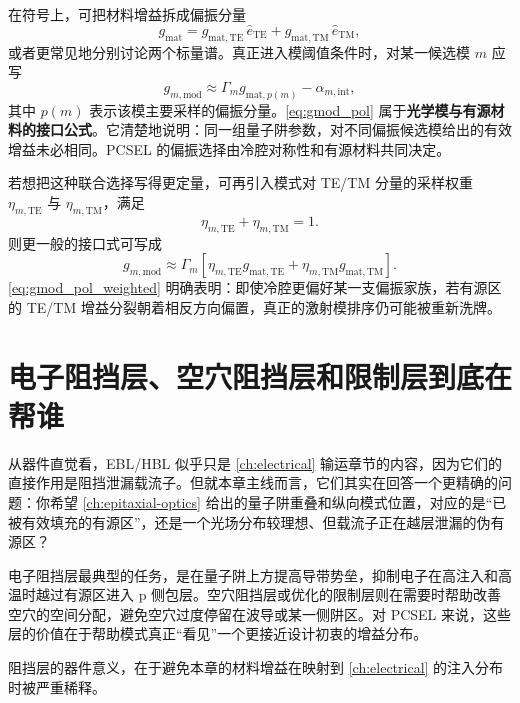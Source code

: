 在符号上，可把材料增益拆成偏振分量
\begin{equation}
 g_{\mathrm{mat}} = g_{\mathrm{mat,TE}}\,\hat{e}_{\mathrm{TE}} + g_{\mathrm{mat,TM}}\,\hat{e}_{\mathrm{TM}},
\end{equation}
或者更常见地分别讨论两个标量谱。真正进入模阈值条件时，对某一候选模 $m$ 应写
\begin{equation}
 g_{m,\mathrm{mod}} \approx \Gamma_m g_{\mathrm{mat},p(m)} - \alpha_{m,\mathrm{int}},
\label{eq:gmod_pol}
\end{equation}
其中 $p(m)$ 表示该模主要采样的偏振分量。\cref{eq:gmod_pol} 属于\textbf{光学模与有源材料的接口公式}。它清楚地说明：同一组量子阱参数，对不同偏振候选模给出的有效增益未必相同。PCSEL 的偏振选择由冷腔对称性和有源材料共同决定。

若想把这种联合选择写得更定量，可再引入模式对 TE/TM 分量的采样权重 $\eta_{m,\mathrm{TE}}$ 与 $\eta_{m,\mathrm{TM}}$，满足
\[
\eta_{m,\mathrm{TE}}+\eta_{m,\mathrm{TM}}=1.
\]
则更一般的接口式可写成
\begin{equation}
g_{m,\mathrm{mod}}
\approx
\Gamma_m\!\left[
\eta_{m,\mathrm{TE}}g_{\mathrm{mat,TE}}
+
\eta_{m,\mathrm{TM}}g_{\mathrm{mat,TM}}
\right].
\label{eq:gmod_pol_weighted}
\end{equation}
\cref{eq:gmod_pol_weighted} 明确表明：即使冷腔更偏好某一支偏振家族，若有源区的 TE/TM 增益分裂朝着相反方向偏置，真正的激射模排序仍可能被重新洗牌。

\section{电子阻挡层、空穴阻挡层和限制层到底在帮谁}
从器件直觉看，EBL/HBL 似乎只是 \cref{ch:electrical} 输运章节的内容，因为它们的直接作用是阻挡泄漏载流子。但就本章主线而言，它们其实在回答一个更精确的问题：你希望 \cref{ch:epitaxial-optics} 给出的量子阱重叠和纵向模式位置，对应的是“已被有效填充的有源区”，还是一个光场分布较理想、但载流子正在越层泄漏的伪有源区？

电子阻挡层最典型的任务，是在量子阱上方提高导带势垒，抑制电子在高注入和高温时越过有源区进入 p 侧包层。空穴阻挡层或优化的限制层则在需要时帮助改善空穴的空间分配，避免空穴过度停留在波导或某一侧阱区。对 PCSEL 来说，这些层的价值在于帮助模式真正“看见”一个更接近设计初衷的增益分布。

阻挡层的器件意义，在于避免本章的材料增益在映射到 \cref{ch:electrical} 的注入分布时被严重稀释。

